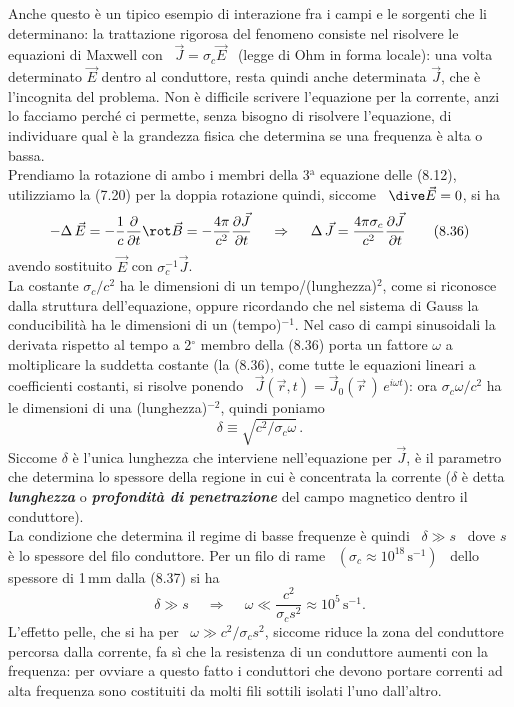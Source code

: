 Anche questo \`e un tipico esempio di interazione fra i campi e le sorgenti che
li determinano: la trattazione rigorosa del fenomeno consiste nel risolvere le
equazioni di Maxwell con \ $\vec J=\sigma_c\vec E$ \ (legge di Ohm in forma
locale): una volta determinato $\vec E$ dentro al conduttore, resta quindi anche
determinata $\vec J$, che \`e l'incognita del problema. Non \`e difficile
scrivere l'equazione per la corrente, anzi lo facciamo perch\'e ci permette,
senza bisogno di risolvere l'equazione, di individuare qual \`e la grandezza
fisica che determina se una frequenza \`e alta o bassa.\\
Prendiamo la rotazione di ambo i membri della 3$^\mathrm{a}$ equazione delle
(8.12), utilizziamo la (7.20) per la doppia rotazione quindi, siccome
\ $\dive\vec E=0$, si ha
\begin{equation}
  -\Delta\,\vec E=-\frac{1}{c}\frac{\partial}{\partial t}\rot\vec B
  =-\frac{4\pi}{c^2}\frac{\partial\vec J}{\partial t}
  \quad\ \Rightarrow\quad\ \Delta\,\vec J
  =\frac{4\pi\sigma_c}{c^2}\frac{\partial\vec J}{\partial t}
  \tag{8.36}
\end{equation}
avendo sostituito $\vec E$ con $\sigma_c^{-1}\vec J$.\\
La costante $\sigma_c/c^2$ ha le dimensioni di un tempo/(lunghezza)$^2$, come si
riconosce dalla struttura dell'equazione, oppure ricordando che nel sistema di
Gauss la conducibilit\`a ha le dimensioni di un (tempo)$^{-1}$. Nel caso di
campi sinusoidali la derivata rispetto al tempo a 2$^\circ$ membro della (8.36)
porta un fattore $\omega$ a moltiplicare la suddetta costante
\big(la (8.36), come tutte le equazioni lineari a coefficienti costanti, si
risolve ponendo \ $\vec J(\vec r,t)=\vec J_0(\vec r\,)\,e^{i\omega t}$\big): ora
$\sigma_c\omega/c^2$ ha le dimensioni di una (lunghezza)$^{-2}$, quindi poniamo
\begin{equation}
  \delta\equiv\sqrt{c^2/\sigma_c\omega}\,.
  \tag{8.37}
\end{equation}
Siccome $\delta$ \`e l'unica lunghezza che interviene nell'equazione per
$\vec J$, \`e il parametro che determina lo spessore della regione in cui \`e
concentrata la corrente ($\delta$ \`e detta \textbf{\textit{lunghezza}} o
\textbf{\textit{profondit\`a di penetrazione}} del campo magnetico dentro il
conduttore).\\
La condizione che determina il regime di basse frequenze \`e quindi
\ $\delta\gg s$ \ dove $s$ \`e lo spessore del filo conduttore. Per un filo di
rame \ $(\sigma_c\approx10^{18}\,\mathrm{s}^{-1})$ \ dello spessore di 1\,mm
dalla (8.37) si ha
\begin{equation}
  \delta\gg s\quad\ \Rightarrow\quad\ \omega\ll\frac{c^2}{\sigma_cs^2}
  \approx10^5\,\mathrm{s}^{-1}.
  \tag{8.38}
\end{equation}
L'effetto pelle, che si ha per \ $\omega\gg c^2/\sigma_cs^2$, siccome riduce la
zona del conduttore percorsa dalla corrente, fa s\`i che la resistenza di un
conduttore aumenti con la frequenza: per ovviare a questo fatto i conduttori che
devono portare correnti ad alta frequenza sono costituiti da molti fili sottili
isolati l'uno dall'altro.


